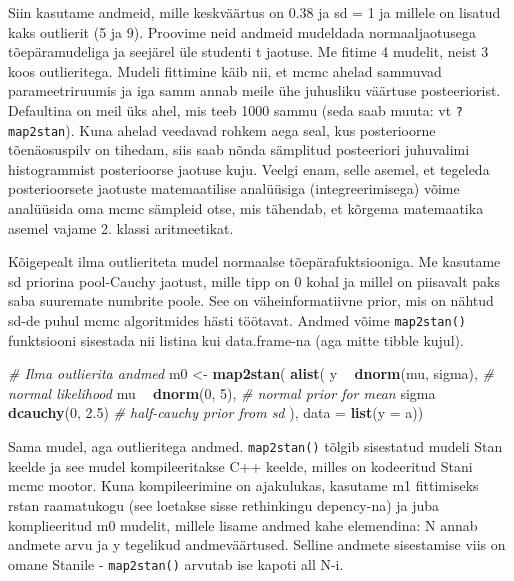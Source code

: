 \documentclass[]{book}
\newenvironment{Shaded}{\begin{snugshade}}{\end{snugshade}}
\newcommand{\CommentTok}[1]{\textcolor[rgb]{0.56,0.35,0.01}{\textit{#1}}}
\newcommand{\DataTypeTok}[1]{\textcolor[rgb]{0.13,0.29,0.53}{#1}}
\newcommand{\DecValTok}[1]{\textcolor[rgb]{0.00,0.00,0.81}{#1}}
\newcommand{\FloatTok}[1]{\textcolor[rgb]{0.00,0.00,0.81}{#1}}
\newcommand{\KeywordTok}[1]{\textcolor[rgb]{0.13,0.29,0.53}{\textbf{#1}}}
\newcommand{\NormalTok}[1]{#1}
\newcommand{\OperatorTok}[1]{\textcolor[rgb]{0.81,0.36,0.00}{\textbf{#1}}}
\newcommand{\StringTok}[1]{\textcolor[rgb]{0.31,0.60,0.02}{#1}}
\begin{document}
Siin kasutame andmeid, mille keskväärtus on 0.38 ja sd = 1 ja millele on lisatud kaks outlierit (5 ja 9). Proovime neid andmeid mudeldada normaaljaotusega tõepäramudeliga ja seejärel üle studenti t jaotuse.
Me fitime 4 mudelit, neist 3 koos outlieritega.
Mudeli fittimine käib nii, et mcmc ahelad sammuvad parameetriruumis ja iga samm annab meile ühe juhusliku väärtuse posteeriorist.
Defaultina on meil üks ahel, mis teeb 1000 sammu (seda saab muuta: vt \texttt{?map2stan}).
Kuna ahelad veedavad rohkem aega seal, kus posterioorne tõenäosuspilv on tihedam, siis saab nõnda sämplitud posteeriori juhuvalimi histogrammist posterioorse jaotuse kuju.
Veelgi enam, selle asemel, et tegeleda posterioorsete jaotuste matemaatilise analüüsiga (integreerimisega) võime analüüsida oma mcmc sämpleid otse, mis tähendab, et kõrgema matemaatika asemel vajame 2. klassi aritmeetikat.

Kõigepealt ilma outlieriteta mudel normaalse tõepärafuktsiooniga.
Me kasutame sd priorina pool-Cauchy jaotust, mille tipp on 0 kohal ja millel on piisavalt paks saba suuremate numbrite poole.
See on väheinformatiivne prior, mis on nähtud sd-de puhul mcmc algoritmides hästi töötavat.
Andmed võime \texttt{map2stan()} funktsiooni sisestada nii listina kui data.frame-na (aga mitte tibble kujul).

\begin{Shaded}
\begin{Highlighting}[]
\CommentTok{# Ilma outlierita andmed}
\NormalTok{m0 <-}\StringTok{ }\KeywordTok{map2stan}\NormalTok{(}
  \KeywordTok{alist}\NormalTok{(}
\NormalTok{    y }\OperatorTok{~}\StringTok{ }\KeywordTok{dnorm}\NormalTok{(mu, sigma),  }\CommentTok{# normal likelihood}
\NormalTok{    mu }\OperatorTok{~}\StringTok{ }\KeywordTok{dnorm}\NormalTok{(}\DecValTok{0}\NormalTok{, }\DecValTok{5}\NormalTok{), }\CommentTok{# normal prior for mean}
\NormalTok{    sigma }\OperatorTok{~}\StringTok{ }\KeywordTok{dcauchy}\NormalTok{(}\DecValTok{0}\NormalTok{, }\FloatTok{2.5}\NormalTok{) }\CommentTok{# half-cauchy prior from sd }
\NormalTok{  ),}
  \DataTypeTok{data =} \KeywordTok{list}\NormalTok{(}\DataTypeTok{y =}\NormalTok{ a))}
\end{Highlighting}
\end{Shaded}

Sama mudel, aga outlieritega andmed. \texttt{map2stan()} tõlgib sisestatud mudeli Stan keelde ja see mudel kompileeritakse C++ keelde, milles on kodeeritud Stani mcmc mootor.
Kuna kompileerimine on ajakulukas, kasutame m1 fittimiseks rstan raamatukogu (see loetakse sisse rethinkingu depency-na) ja juba komplieeritud m0 mudelit, millele lisame andmed kahe elemendina: N annab andmete arvu ja y tegelikud andmeväärtused.
Selline andmete sisestamise viis on omane Stanile - \texttt{map2stan()} arvutab ise kapoti all N-i.
\end{document}
